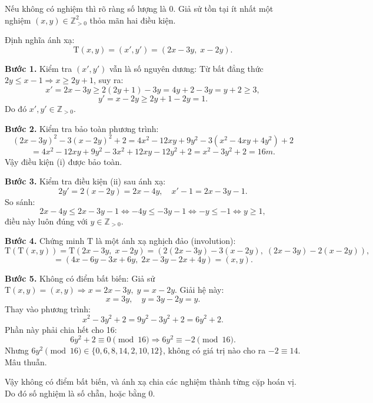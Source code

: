 \documentclass[../04-diophantine-equations.tex]{subfiles}
\begin{document}
\begin{soln}\footnotemark
    Nếu không có nghiệm thì rõ ràng số lượng là 0. Giả sử tồn tại ít nhất một nghiệm \( (x, y) \in \mathbb{Z}_{>0}^2 \) thỏa mãn hai điều kiện.

    Định nghĩa ánh xạ:
    \[
        \mathrm{T}(x, y) = (x', y') = (2x - 3y,\; x - 2y).
    \]

    \textbf{Bước 1.} Kiểm tra \( (x', y') \) vẫn là số nguyên dương:  
    Từ bất đẳng thức \( 2y \le x - 1 \Rightarrow x \ge 2y + 1 \), suy ra:
    \[
        x' = 2x - 3y \ge 2(2y + 1) - 3y = 4y + 2 - 3y = y + 2 \ge 3,
    \]
    \[
        y' = x - 2y \ge 2y + 1 - 2y = 1.
    \]
    Do đó \( x', y' \in \mathbb{Z}_{>0} \).

    \textbf{Bước 2.} Kiểm tra bảo toàn phương trình:
    \[
        (2x - 3y)^2 - 3(x - 2y)^2 + 2
        = 4x^2 - 12xy + 9y^2 - 3(x^2 - 4xy + 4y^2) + 2
    \]
    \[
        = 4x^2 - 12xy + 9y^2 - 3x^2 + 12xy - 12y^2 + 2
        = x^2 - 3y^2 + 2 = 16m.
    \]
    Vậy điều kiện (i) được bảo toàn.

    \textbf{Bước 3.} Kiểm tra điều kiện (ii) sau ánh xạ:
    \[
        2y' = 2(x - 2y) = 2x - 4y,\quad x' - 1 = 2x - 3y - 1.
    \]
    So sánh:
    \[
        2x - 4y \le 2x - 3y - 1 \iff -4y \le -3y - 1 \iff -y \le -1 \iff y \ge 1,
    \]
    điều này luôn đúng với \( y \in \mathbb{Z}_{>0} \).

    \textbf{Bước 4.} Chứng minh \( \mathrm{T} \) là một ánh xạ nghịch đảo (involution):
    \[
        \mathrm{T}(\mathrm{T}(x, y)) = \mathrm{T}(2x - 3y,\; x - 2y) = (2(2x - 3y) - 3(x - 2y),\; (2x - 3y) - 2(x - 2y)),
    \]
    \[
        = (4x - 6y - 3x + 6y,\; 2x - 3y - 2x + 4y) = (x, y).
    \]

    \textbf{Bước 5.} Không có điểm bất biến:  
    Giả sử \( \mathrm{T}(x, y) = (x, y) \Rightarrow x = 2x - 3y,\; y = x - 2y \).  
    Giải hệ này:
    \[
        x = 3y,\quad y = 3y - 2y = y.
    \]
    Thay vào phương trình:
    \[
        x^2 - 3y^2 + 2 = 9y^2 - 3y^2 + 2 = 6y^2 + 2.
    \]
    Phần này phải chia hết cho 16:
    \[
        6y^2 + 2 \equiv 0 \pmod{16} \Rightarrow 6y^2 \equiv -2 \pmod{16}.
    \]
    Nhưng \( 6y^2 \pmod{16} \in \{0, 6, 8, 14, 2, 10, 12\} \), không có giá trị nào cho ra \( -2 \equiv 14 \). Mâu thuẫn.

    Vậy không có điểm bất biến, và ánh xạ chia các nghiệm thành từng cặp hoán vị.  
    Do đó số nghiệm là số chẵn, hoặc bằng 0.
\end{soln}

\end{document}
